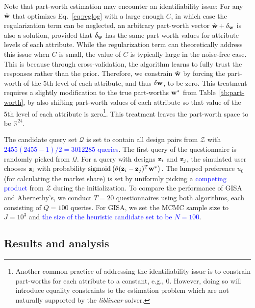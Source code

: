 \documentclass[onecolumn,11pt]{article}
\newcommand{\highlight}[1]{{\textcolor{blue}{{#1}}}}
\newcommand{\highlight}[1]{{{#1}}}
\newcommand{\cutsubsectionup}{\vspace*{-0.09in}}
\newcommand{\cutsubsectionup}{}
\begin{document}
Note that part-worth estimation may encounter an identifiability issue: For any $\hat{\bf w}$ that optimizes Eq.~\eqref{eq:reglog} with a large enough $C$, in which case the regularization term can be neglected, an arbitrary part-worth vector $\hat{\bf w}+\delta_{\bf w}$ is also a solution, provided that $\delta_{\bf w}$ has the same part-worth values for attribute levels of each attribute. While the regularization term can theoretically address this issue when $C$ is small, the value of $C$ is typically large in the noise-free case. This is because through cross-validation, the algorithm learns to fully trust the responses rather than the prior. Therefore, we constrain $\hat{\bf w}$ by forcing the part-worth of the 5th level of each attribute, and thus $\delta {\bf w}$, to be zero. This treatment requires a slightly modification to the true part-worths ${\bf w}^*$ from Table~\ref{tb:part-worth}, by also shifting part-worth values of each attribute so that value of the 5th level of each attribute is zero\footnote{Another common practice of addressing the identifiability issue is to constrain part-worths for each attribute to a constant, e.g., $0$. However, doing so will introduce equality constraints to the estimation problem which are not naturally supported by the {\it liblinear} solver.}. This treatment leaves the part-worth space to be $\mathbb{R}^{24}$.

The candidate query set $\mathcal{Q}$ is set to contain all design pairs from $\mathcal{Z}$ with \highlight{$2455(2455-1)/2 = 3012285$ queries}. The first query of the questionnaire is randomly picked from $\mathcal{Q}$. For a query with designs ${\bf z}_{i}$ and ${\bf z}_{j}$, the simulated user chooses ${\bf z}_i$ with probability $\text{sigmoid}\left(\theta({\bf z}_{i}-{\bf z}_{j})^T{\bf w}^*\right)$. The lumped preference $u_0$ (for calculating the market share) is set by uniformly picking a \highlight{competing product} from $\mathcal{Z}$ during the initialization. To compare the performance of GISA and Abernethy's, we conduct $T=20$ questionnaires using both algorithms, each consisting of $Q=100$ queries. For GISA, we set the MCMC sample size to $J=10^3$ and \highlight{the size of the heuristic candidate set to be $N=100$}.

\cutsubsectionup
\subsection{Results and analysis}
\label{sec:results}
\end{document}
